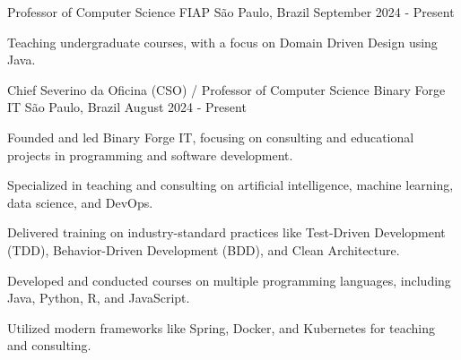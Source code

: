 

\begin{cventries}

\cventry
    {Professor of Computer Science} %
    {FIAP} %
    {São Paulo, Brazil} %
    {September 2024 - Present} %
    {
      \begin{cvitems} %
        \item {Teaching undergraduate courses, with a focus on Domain Driven Design using Java.}
      \end{cvitems}
    }

\cventry
    {Chief Severino da Oficina (CSO) / Professor of Computer Science} %
    {Binary Forge IT} %
    {São Paulo, Brazil} %
    {August 2024 - Present} %
    {
      \begin{cvitems} %
        \item {Founded and led Binary Forge IT, focusing on consulting and educational projects in programming and software development.}
        \item {Specialized in teaching and consulting on artificial intelligence, machine learning, data science, and DevOps.}
        \item {Delivered training on industry-standard practices like Test-Driven Development (TDD), Behavior-Driven Development (BDD), and Clean Architecture.}
        \item {Developed and conducted courses on multiple programming languages, including Java, Python, R, and JavaScript.}
        \item {Utilized modern frameworks like Spring, Docker, and Kubernetes for teaching and consulting.}
      \end{cvitems}
    }


\end{cventries}
